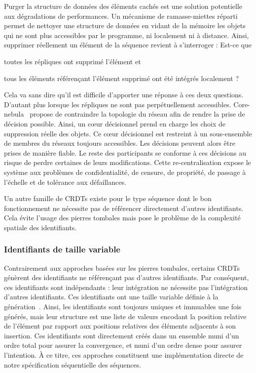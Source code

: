Purger la structure de données des éléments cachés est une solution potentielle
aux dégradations de performances. Un mécanisme de ramasse-miettes
réparti~\cite{abdullahi1998garbage} permet de nettoyer une structure de données
en vidant de la mémoire les objets qui ne sont plus accessibles par le
programme, ni localement ni à distance. Ainsi, supprimer réellement un élément
de la séquence revient à s'interroger : \og Est-ce que
\begin{inparaenum}[(i)]
\item toutes les répliques ont supprimé l'élément et
\item tous les éléments référençant l'élément supprimé ont été intégrés
  localement ?
\end{inparaenum}\fg Cela va sans dire qu'il est difficile d'apporter une réponse
à ces deux questions. D'autant plus lorsque les répliques ne sont pas
perpétuellement accessibles. Core-nebula~\cite{letia2009crdts} propose de
contraindre la topologie du réseau afin de rendre la prise de décision
possible. Ainsi, un cœur décisionnel prend en charge les choix de suppression
réelle des objets.  Ce cœur décisionnel est restreint à un sous-ensemble de
membres du réseaux toujours accessibles. Les décisions peuvent alors être prises
de manière fiable. Le reste des participants se conforme à ces décisions au
risque de perdre certaines de leurs modifications. Cette re-centralisation
expose le système aux problèmes de confidentialité, de censure, de propriété, de
passage à l'échelle et de tolérance aux défaillances.
 
Un autre famille de CRDTs existe pour le type séquence dont le bon
fonctionnement ne nécessite pas de référencer directement d'autres
identifiants. Cela évite l'usage des pierres tombales mais pose le problème de
la complexité spatiale des identifiants.

\subsubsection{Identifiants de taille variable}
\label{repl:subsubsec:variable}

Contrairement aux approches basées sur les pierres tombales, certains CRDTs
génèrent des identifiants ne référençant pas d'autres identifiants. Par
conséquent, ces identifiants sont indépendants : leur intégration ne nécessite
pas l'intégration d'autres identifiants. Ces identifiants ont une taille
variable définie à la génération~\cite{andre2013supporting,
  preguica2009commutative, weiss2009logoot}.  Ainsi, les identifiants sont
toujours uniques et immuables une fois générés, mais leur structure est une
liste de valeurs encodant la position relative de l'élément par rapport aux
positions relatives des éléments adjacents à son insertion. Ces identifiants
sont directement créés dans un ensemble muni d'un ordre total pour assurer la
convergence, et muni d'un ordre dense pour assurer l'intention. À ce titre, ces
approches constituent une implémentation directe de notre spécification
séquentielle des séquences.

